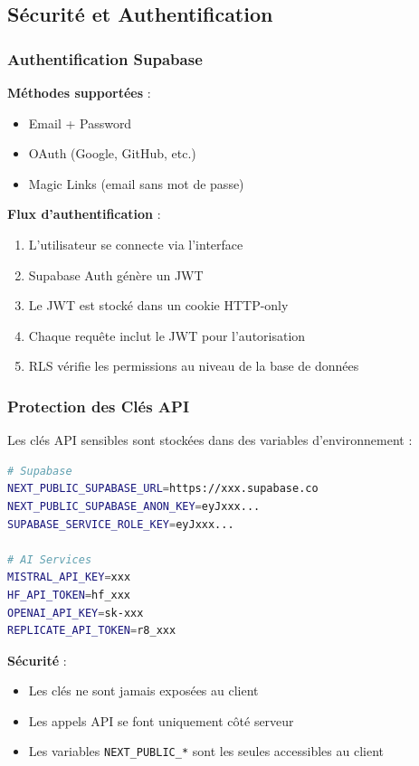 \subsection{Sécurité et Authentification}

\subsubsection{Authentification Supabase}

\textbf{Méthodes supportées} :
\begin{itemize}[leftmargin=*]
    \item Email + Password
    \item OAuth (Google, GitHub, etc.)
    \item Magic Links (email sans mot de passe)
\end{itemize}

\textbf{Flux d'authentification} :
\begin{enumerate}[leftmargin=*]
    \item L'utilisateur se connecte via l'interface
    \item Supabase Auth génère un JWT
    \item Le JWT est stocké dans un cookie HTTP-only
    \item Chaque requête inclut le JWT pour l'autorisation
    \item RLS vérifie les permissions au niveau de la base de données
\end{enumerate}

\subsubsection{Protection des Clés API}

Les clés API sensibles sont stockées dans des variables d'environnement :

\begin{lstlisting}[language=bash, caption=Fichier .env.local]
# Supabase
NEXT_PUBLIC_SUPABASE_URL=https://xxx.supabase.co
NEXT_PUBLIC_SUPABASE_ANON_KEY=eyJxxx...
SUPABASE_SERVICE_ROLE_KEY=eyJxxx...

# AI Services
MISTRAL_API_KEY=xxx
HF_API_TOKEN=hf_xxx
OPENAI_API_KEY=sk-xxx
REPLICATE_API_TOKEN=r8_xxx
\end{lstlisting}

\textbf{Sécurité} :
\begin{itemize}[leftmargin=*]
    \item Les clés ne sont jamais exposées au client
    \item Les appels API se font uniquement côté serveur
    \item Les variables \texttt{NEXT\_PUBLIC\_*} sont les seules accessibles au client
\end{itemize}

